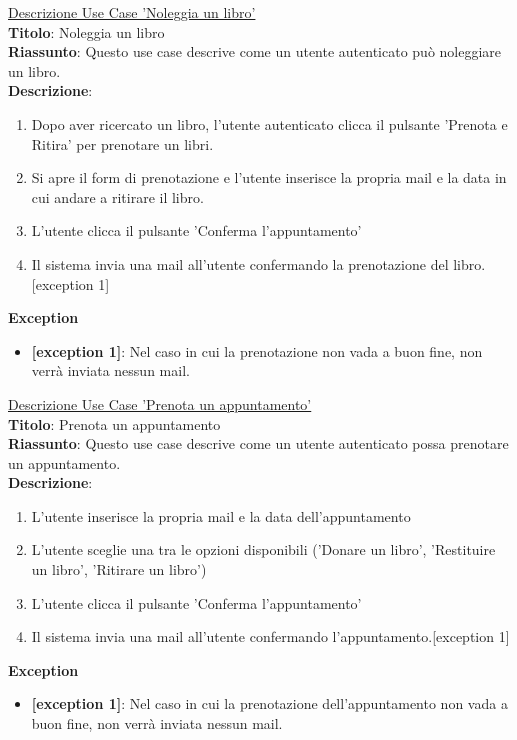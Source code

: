 \documentclass{article}
\begin{document}
\noindent\underline{Descrizione Use Case 'Noleggia un libro'}\\
    \textbf{Titolo}: Noleggia un libro\\
    \textbf{Riassunto}: Questo use case descrive come un utente autenticato può noleggiare un libro.\\
    \textbf{Descrizione}: 
    \begin{enumerate}
        \item Dopo aver ricercato un libro, l'utente autenticato clicca il pulsante 'Prenota e Ritira' per prenotare un libri.
        \item Si apre il form di prenotazione e l'utente inserisce la propria mail e la data in cui andare a ritirare il libro.
        \item L'utente clicca il pulsante 'Conferma l'appuntamento'
        \item Il sistema invia una mail all'utente confermando la prenotazione del libro. [exception 1]
    \end{enumerate}
    \textbf{Exception}
\begin{itemize}
    \item \textbf{[exception 1]}: Nel caso in cui la prenotazione non vada a buon fine, non verrà inviata nessun mail.
\end{itemize}

\noindent\underline{Descrizione Use Case 'Prenota un appuntamento'}\\
\textbf{Titolo}: Prenota un appuntamento\\
\textbf{Riassunto}: Questo use case descrive come un utente autenticato possa prenotare un appuntamento.\\
\textbf{Descrizione}: 
\begin{enumerate}
    \item L'utente inserisce la propria mail e la data dell'appuntamento
    \item L'utente sceglie una tra le opzioni disponibili ('Donare un libro', 'Restituire un libro', 'Ritirare un libro')
    \item L'utente clicca il pulsante 'Conferma l'appuntamento'
    \item Il sistema invia una mail all'utente confermando l'appuntamento.[exception 1]
\end{enumerate}
\textbf{Exception}
\begin{itemize}
    \item \textbf{[exception 1]}: Nel caso in cui la prenotazione dell'appuntamento non vada a buon fine, non verrà inviata nessun mail.
\end{itemize}
\end{document}
